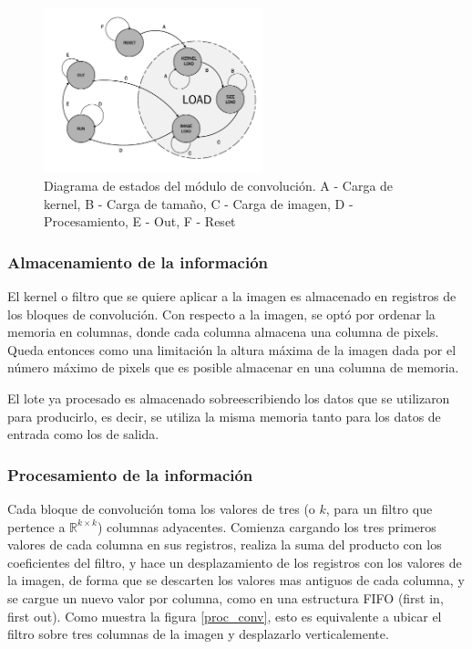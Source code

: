 \documentclass[conference,compsoc]{IEEEtran}
\begin{document}
\begin{figure}[!t]
  \centering
  \includegraphics[width=2.5in]{states.pdf}
  \caption{Diagrama de estados del m\'odulo de convoluci\'on.
    A - Carga de kernel, B - Carga de tama\~no, C - Carga de imagen, D -
    Procesamiento, E - Out, F - Reset}
  \label{state}
\end{figure}

\subsubsection{Almacenamiento de la informaci\'on}
El kernel o filtro que se quiere aplicar a la imagen es almacenado en registros de los bloques de convoluci\'on. Con
respecto a la imagen, se opt\'o por ordenar la memoria en columnas, donde cada
columna almacena una columna de pixels. Queda entonces como una limitaci\'on la
altura m\'axima de la imagen dada por el n\'umero m\'aximo de pixels que es
posible almacenar en una columna de memoria.

El lote ya procesado es almacenado sobreescribiendo los datos que se utilizaron
para producirlo, es decir, se utiliza la misma memoria tanto para los datos de
entrada como los de salida.

\subsubsection{Procesamiento de la informaci\'on}
Cada bloque de convoluci\'on toma los valores de tres (o $k$, para un filtro que
pertence a $\mathbb{R}^{k{\times}k}$) columnas adyacentes. Comienza cargando los
tres primeros valores de cada columna en sus registros, realiza la suma del
producto con los coeficientes del filtro, y hace un 
desplazamiento de los registros con los valores de la imagen, de forma que se
descarten los valores mas antiguos de cada columna, y se cargue un nuevo valor
por columna, como en una estructura FIFO (first in, first out). Como muestra
la figura \ref{proc_conv}, esto es equivalente a ubicar el filtro sobre tres
columnas de la imagen y desplazarlo verticalemente.
\end{document}
